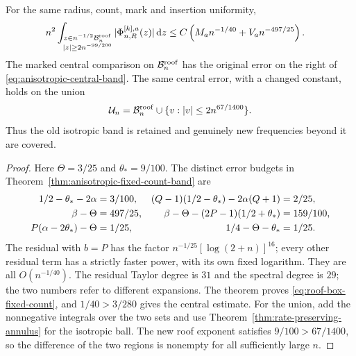 \begin{corollary}
\label{cor:roof-box-fixed-count}
For the same radius, count, mark and insertion uniformity,
\begin{align}
 &n^2\int_{\substack{z\in n^{-1/2}\mathcal B_n^{\rm roof}\\
                            |z|\ge2n^{-99/200}}}
         |\Phi^{[k],a}_{n,R}(z)|\dd z
   \le C\left(M_an^{-1/40}+V_an^{-497/25}\right).
 \label{eq:roof-box-fixed-count}
\end{align}
The marked central comparison on $\mathcal B_n^{\rm roof}$ has the
original error on the right of \eqref{eq:anisotropic-central-band}.
The same central error, with a changed constant, holds on the union
\begin{equation}\label{eq:roof-box-union}
 \mathcal U_n=\mathcal B_n^{\rm roof}
                    \cup\{v:|v|\le2n^{67/1400}\}.
\end{equation}
Thus the old isotropic band is retained and genuinely new frequencies
beyond it are covered.
\end{corollary}
\begin{proof}
Here $\Theta=3/25$ and $\theta_*=9/100$. The distinct error
budgets in Theorem~\ref{thm:anisotropic-fixed-count-band} are
\begin{align}
 1/2-\theta_*-2\alpha&=3/100,&
 (Q-1)(1/2-\theta_*)-2\alpha(Q+1)&=2/25,\notag\\
 \beta-\Theta&=497/25,&
 \beta-\Theta-(2P-1)(1/2+\theta_*)&=159/100,\notag\\
 P(\alpha-2\theta_*)-\Theta&=1/25,&
 1/4-\Theta-\theta_*&=1/25.
 \label{eq:roof-box-exponent-ledger}
\end{align}
The residual with $b=P$ has the factor
$n^{-1/25}[\log(2+n)]^{16}$; every other residual term has a
strictly faster power, with its own fixed logarithm. They are all
$O(n^{-1/40})$. The residual Taylor degree is $31$ and the spectral
degree is $29$; the two numbers refer to different expansions.
The theorem proves \eqref{eq:roof-box-fixed-count}, and
$1/40>3/280$ gives the central estimate. For the union, add the
nonnegative integrals over the two sets and use
Theorem~\ref{thm:rate-preserving-annulus} for the isotropic ball.
The new roof exponent satisfies $9/100>67/1400$, so the difference
of the two regions is nonempty for all sufficiently large $n$.
\end{proof}

